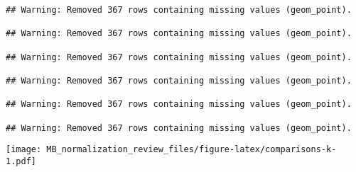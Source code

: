 \documentclass[
]{book}
\begin{document}
\begin{verbatim}
## Warning: Removed 367 rows containing missing values (geom_point).

## Warning: Removed 367 rows containing missing values (geom_point).

## Warning: Removed 367 rows containing missing values (geom_point).

## Warning: Removed 367 rows containing missing values (geom_point).

## Warning: Removed 367 rows containing missing values (geom_point).

## Warning: Removed 367 rows containing missing values (geom_point).
\end{verbatim}

\texttt{[image: MB\_normalization\_review\_files/figure-latex/comparisons-k-1.pdf]}

  
\end{document}
